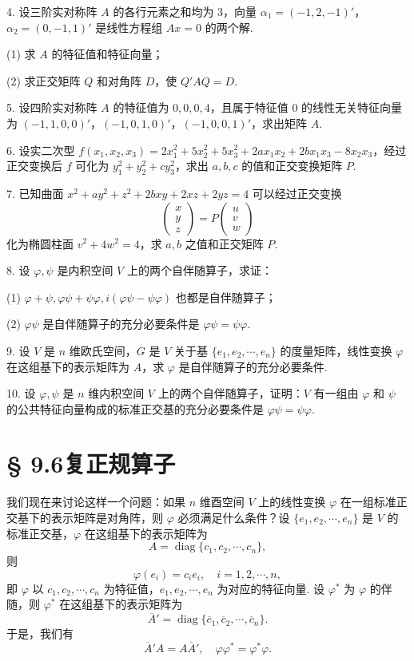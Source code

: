 \documentclass[UTF8,12pt,a4paper,fontset=fandol]{ctexart}
\begin{document}
4. 设三阶实对称阵 $A$ 的各行元素之和均为 $3$，向量 $\alpha_1=(-1,2,-1)'$，$\alpha_2=(0,-1,1)'$ 是线性方程组 $Ax=0$ 的两个解.

(1) 求 $A$ 的特征值和特征向量；

(2) 求正交矩阵 $Q$ 和对角阵 $D$，使 $Q'AQ=D$.

5. 设四阶实对称阵 $A$ 的特征值为 $0,0,0,4$，且属于特征值 $0$ 的线性无关特征向量为 $(-1,1,0,0)'$，$(-1,0,1,0)'$，$(-1,0,0,1)'$，求出矩阵 $A$.

6. 设实二次型 $f(x_1,x_2,x_3)=2x_1^2+5x_2^2+5x_3^2+2ax_1x_2+2bx_1x_3-8x_2x_3$，经过正交变换后 $f$ 可化为 $y_1^2+y_2^2+cy_3^2$，求出 $a,b,c$ 的值和正交变换矩阵 $P$.

7. 已知曲面 $x^2+ay^2+z^2+2bxy+2xz+2yz=4$ 可以经过正交变换
\[
  \left(\begin{array}{c}
    x\\ y\\ z
  \end{array}\right)
  =P
  \left(\begin{array}{c}
    u\\ v\\ w
  \end{array}\right)
\]
化为椭圆柱面 $v^2+4w^2=4$，求 $a,b$ 之值和正交矩阵 $P$.

8. 设 $\varphi,\psi$ 是内积空间 $V$ 上的两个自伴随算子，求证：

(1) $\varphi+\psi,\varphi\psi+\psi\varphi,i(\varphi\psi-\psi\varphi)$ 也都是自伴随算子；

(2) $\varphi\psi$ 是自伴随算子的充分必要条件是 $\varphi\psi=\psi\varphi$.

9. 设 $V$ 是 $n$ 维欧氏空间，$G$ 是 $V$ 关于基 $\{e_1,e_2,\cdots,e_n\}$ 的度量矩阵，线性变换 $\varphi$ 在这组基下的表示矩阵为 $A$，求 $\varphi$ 是自伴随算子的充分必要条件.

10. 设 $\varphi,\psi$ 是 $n$ 维内积空间 $V$ 上的两个自伴随算子，证明：$V$ 有一组由 $\varphi$ 和 $\psi$ 的公共特征向量构成的标准正交基的充分必要条件是 $\varphi\psi=\psi\varphi$.

\section*{§ 9.6\quad 复正规算子}

我们现在来讨论这样一个问题：如果 $n$ 维酉空间 $V$ 上的线性变换 $\varphi$ 在一组标准正交基下的表示矩阵是对角阵，则 $\varphi$ 必须满足什么条件？设 $\{e_1,e_2,\cdots,e_n\}$ 是 $V$ 的标准正交基，$\varphi$ 在这组基下的表示矩阵为
\[
  A=\operatorname{diag}\{c_1,c_2,\cdots,c_n\},
\]
则
\[
  \varphi(e_i)=c_ie_i,\quad i=1,2,\cdots,n,
\]
即 $\varphi$ 以 $c_1,c_2,\cdots,c_n$ 为特征值，$e_1,e_2,\cdots,e_n$ 为对应的特征向量. 设 $\varphi^*$ 为 $\varphi$ 的伴随，则 $\varphi^*$ 在这组基下的表示矩阵为
\[
  \overline A'=\operatorname{diag}\{\overline c_1,\overline c_2,\cdots,\overline c_n\}.
\]
于是，我们有
\[
  \overline A'A=A\overline A',\quad \varphi\varphi^*=\varphi^*\varphi.
\]
\end{document}
